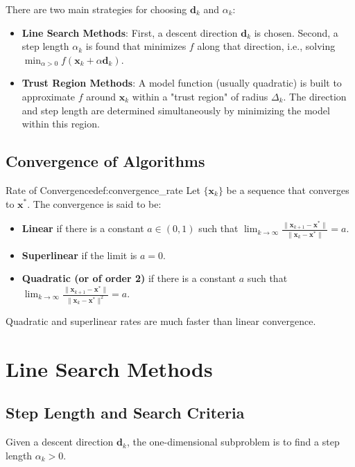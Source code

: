 \documentclass{MathNote}
\begin{document}
There are two main strategies for choosing $\bm{d}_k$ and $\alpha_k$:
\begin{itemize}
	\item \textbf{Line Search Methods}: First, a descent direction $\bm{d}_k$ is chosen. Second, a step length $\alpha_k$ is found that minimizes $f$ along that direction, i.e., solving $\min_{\alpha > 0} f(\bm{x}_k + \alpha \bm{d}_k)$.
	\item \textbf{Trust Region Methods}: A model function (usually quadratic) is built to approximate $f$ around $\bm{x}_k$ within a "trust region" of radius $\Delta_k$. The direction and step length are determined simultaneously by minimizing the model within this region.
\end{itemize}


\subsection{Convergence of Algorithms}

\begin{definition}{Rate of Convergence}{def:convergence_rate}
	Let $\{\bm{x}_k\}$ be a sequence that converges to $\bm{x}^*$. The convergence is said to be:
	\begin{itemize}
		\item \textbf{Linear} if there is a constant $a \in (0, 1)$ such that $\lim_{k \to \infty} \frac{\|\bm{x}_{k+1} - \bm{x}^*\|}{\|\bm{x}_k - \bm{x}^*\|} = a$.
		\item \textbf{Superlinear} if the limit is $a=0$.
		\item \textbf{Quadratic (or of order 2)} if there is a constant $a$ such that $\lim_{k \to \infty} \frac{\|\bm{x}_{k+1} - \bm{x}^*\|}{\|\bm{x}_k - \bm{x}^*\|^2} = a$.
	\end{itemize}
	Quadratic and superlinear rates are much faster than linear convergence.
\end{definition}


\section{Line Search Methods}

\subsection{Step Length and Search Criteria}
Given a descent direction $\bm{d}_k$, the one-dimensional subproblem is to find a step length $\alpha_k > 0$.
\end{document}
